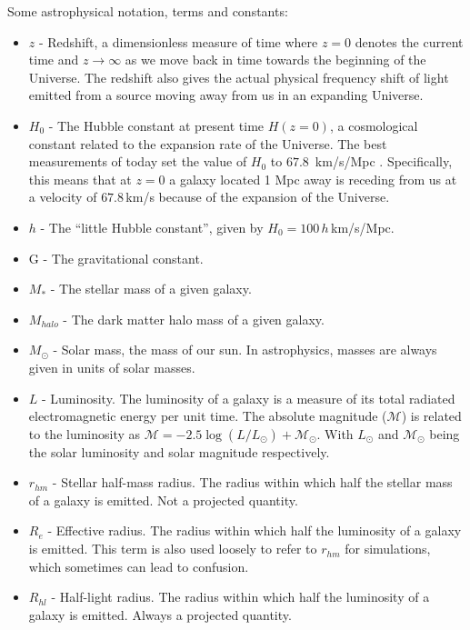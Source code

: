 Some astrophysical notation, terms and constants:

\begin{itemize}
    \item $z$ - Redshift, a dimensionless measure of time where $z=0$ denotes the current time and $z \rightarrow \infty$ as we move back in time towards the beginning of the Universe. The redshift also gives the actual physical frequency shift of light emitted from a source moving away from us in an expanding Universe.
    \item $H_{0}$ - The Hubble constant at present time $H(z=0)$, a cosmological constant related to the expansion rate of the Universe. The best measurements of today set the value of $H_0$ to $67.8\, $ km/s/Mpc \parencite{Planck2016}. Specifically, this means that at $z=0$ a galaxy located 1 Mpc away is receding from us at a velocity of $67.8\,$km/s because of the expansion of the Universe.
    \item $h$ - The ``little Hubble constant'', given by $H_0 = 100\,h\,$km/s/Mpc.
    \item G - The gravitational constant. 
    \item $M_{\ast}$ - The stellar mass of a given galaxy.
    \item $M_{halo}$ - The dark matter halo mass of a given galaxy.
    \item $M_{\odot}$ - Solar mass, the mass of our sun. In astrophysics, masses are always given in units of solar masses.
    \item $L$ - Luminosity. The luminosity of a galaxy is a measure of its total radiated electromagnetic energy per unit time. The absolute magnitude ($\mathcal{M}$) is related to the luminosity as $\mathcal{M} = -2.5 \log(L/L_\odot) + \mathcal{M}_\odot$. With $L_\odot$ and $\mathcal{M}_\odot$ being the solar luminosity and solar magnitude respectively.
    \item $r_{hm}$ - Stellar half-mass radius. The radius within which half the stellar mass of a galaxy is emitted. Not a projected quantity.
    \item $R_e$ - Effective radius. The radius within which half the luminosity of a galaxy is emitted. This term is also used loosely to refer to $r_{hm}$ for simulations, which sometimes can lead to confusion.
    \item $R_{hl}$ - Half-light radius. The radius within which half the luminosity of a galaxy is emitted. Always a projected quantity.
\end{itemize}

